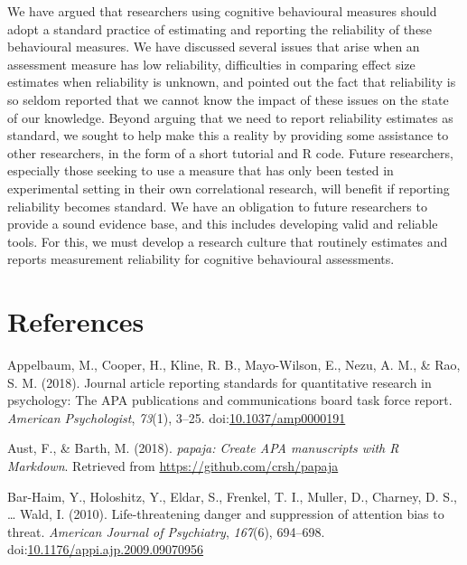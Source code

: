 \documentclass[english,,man,floatsintext]{apa6}
\begin{document}
We have argued that researchers using cognitive behavioural measures should adopt a standard practice of estimating and reporting the reliability of these behavioural measures. We have discussed several issues that arise when an assessment measure has low reliability, difficulties in comparing effect size estimates when reliability is unknown, and pointed out the fact that reliability is so seldom reported that we cannot know the impact of these issues on the state of our knowledge. Beyond arguing that we need to report reliability estimates as standard, we sought to help make this a reality by providing some assistance to other researchers, in the form of a short tutorial and R code. Future researchers, especially those seeking to use a measure that has only been tested in experimental setting in their own correlational research, will benefit if reporting reliability becomes standard. We have an obligation to future researchers to provide a sound evidence base, and this includes developing valid and reliable tools. For this, we must develop a research culture that routinely estimates and reports measurement reliability for cognitive behavioural assessments.

\newpage

\hypertarget{references}{%
\section{References}\label{references}}

\setlength{\parindent}{-0.5in}
\setlength{\leftskip}{0.5in}
\setlength{\parskip}{8pt}

\noindent

\hypertarget{refs}{}
\leavevmode\hypertarget{ref-appelbaum_journal_2018}{}%
Appelbaum, M., Cooper, H., Kline, R. B., Mayo-Wilson, E., Nezu, A. M., \& Rao, S. M. (2018). Journal article reporting standards for quantitative research in psychology: The APA publications and communications board task force report. \emph{American Psychologist}, \emph{73}(1), 3--25. doi:\href{https://doi.org/10.1037/amp0000191}{10.1037/amp0000191}

\leavevmode\hypertarget{ref-R-papaja}{}%
Aust, F., \& Barth, M. (2018). \emph{papaja: Create APA manuscripts with R Markdown}. Retrieved from \url{https://github.com/crsh/papaja}

\leavevmode\hypertarget{ref-bar-haim_life-threatening_2010}{}%
Bar-Haim, Y., Holoshitz, Y., Eldar, S., Frenkel, T. I., Muller, D., Charney, D. S., \ldots{} Wald, I. (2010). Life-threatening danger and suppression of attention bias to threat. \emph{American Journal of Psychiatry}, \emph{167}(6), 694--698. doi:\href{https://doi.org/10.1176/appi.ajp.2009.09070956}{10.1176/appi.ajp.2009.09070956}
\end{document}
